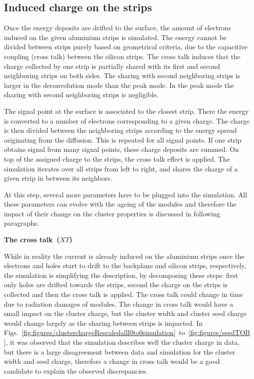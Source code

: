 
\subsection{Induced charge on the strips~\label{sec:induce}}

Once the energy deposits are drifted to the surface, the amount of electrons induced on the given aluminium strips is simulated. The energy cannot be divided between strips purely based on geometrical criteria, due to the capacitive coupling (cross talk) between the silicon strips. The cross talk induces that the charge collected by one strip is partially shared with its first and second neighboring strips on both sides. The sharing with second neighboring strips is larger in the deconvolution mode than the peak mode. In the peak mode the sharing with second neighboring strips is negligible.   

The signal point at the surface is associated to the closest strip. There the energy is converted to a number of electrons corresponding to a given charge. The charge is then divided between the neighboring strips according to the energy spread originating from the diffusion. This is repeated for all signal points. If one strip obtains signal from many signal points, these charge deposits are summed. On top of the assigned charge to the strips, the cross talk effect is applied. The simulation iterates over all strips from left to right, and shares the charge of a given strip in between its neighbors.

At this step, several more parameters have to be plugged into the simulation. All these parameters can evolve with the ageing of the modules and therefore the impact of their change on the cluster properties is discussed in following paragraphs. 

\textbf{The cross talk~($XT$)}

While in reality the current is already induced on the aluminium strips once the electrons and holes start to drift to the backplane and silicon strips, respectively, the simulation is simplifying the description, by decomposing these steps: first only holes are drifted towards the strips, second the charge on the strips is collected and then the cross talk is applied. The cross talk could change in time due to radiation damages of modules. The change in cross talk would have a small impact on the cluster charge, but the cluster width and cluster seed charge would change largely as the sharing between strips is impacted. In Figs.~\ref{fig:figures/clusterchargeRescaledalll0to0simulation}~to~\ref{fig:figures/seedTOB}, it was observed that the simulation describes well the cluster charge in data, but there is a large disagreement between data and simulation for the cluster width and seed charge, therefore a change in cross talk would be a good candidate to explain the observed discrepancies.  

